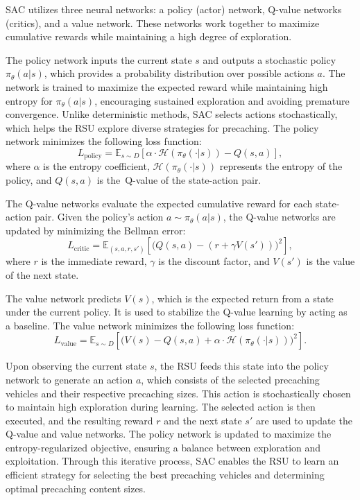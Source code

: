 \documentclass{aims}
\numberwithin{equation}{section}
\begin{document}
SAC utilizes three neural networks: a policy (actor) network, Q-value networks (critics), and a value network.
These networks work together to maximize cumulative rewards while maintaining a high degree of exploration.

The policy network inputs the current state $s$ and outputs a stochastic policy $\pi_{\theta}(a|s)$, which provides a probability distribution over possible actions $a$.
The network is trained to maximize the expected reward while maintaining high entropy for $\pi_{\theta}(a|s)$, encouraging sustained exploration and avoiding premature convergence.
Unlike deterministic methods, SAC selects actions stochastically, which helps the RSU explore diverse strategies for precaching.
The policy network minimizes the following loss function:
\begin{equation}
    L_{\text{policy}} = \mathbb{E}_{s \sim D} \left[ \alpha \cdot \mathcal{H}(\pi_{\theta}(\cdot|s)) - Q(s, a) \right],
\end{equation}
where $\alpha$ is the entropy coefficient, $\mathcal{H}(\pi_{\theta}(\cdot|s))$ represents the entropy of the policy, and $Q(s, a)$ is the~Q-value of the state-action pair.

The Q-value networks evaluate the expected cumulative reward for each state-action pair.
Given the policy's action $a \sim \pi_{\theta}(a|s)$, the Q-value networks are updated by minimizing the Bellman error:
\begin{equation}
    L_{\text{critic}} = \mathbb{E}_{(s, a, r, s')} \left[ \big( Q(s, a) - (r + \gamma V(s')) \big)^2 \right],
\end{equation}
where $r$ is the immediate reward, $\gamma$ is the discount factor, and $V(s')$ is the value of the next state.

The value network predicts $V(s)$, which is the expected return from a state under the current policy.
It is used to stabilize the Q-value learning by acting as a baseline.
The value network minimizes the following loss function:
\begin{equation}
    L_{\text{value}} = \mathbb{E}_{s \sim D} \left[ \big( V(s) - Q(s, a) + \alpha \cdot \mathcal{H}(\pi_{\theta}(\cdot|s)) \big)^2 \right].
\end{equation}

Upon observing the current state $s$, the RSU feeds this state into the policy network to generate an action $a$, which consists of the selected precaching vehicles and their respective precaching sizes.
This action is stochastically chosen to maintain high exploration during learning.
The selected action is then executed, and the resulting reward $r$ and the next state $s'$ are used to update the Q-value and value networks.
The policy network is updated to maximize the entropy-regularized objective, ensuring a balance between exploration and exploitation.
Through this iterative process, SAC enables the RSU to learn an efficient strategy for selecting the best precaching vehicles and determining optimal precaching content sizes.
\end{document}
